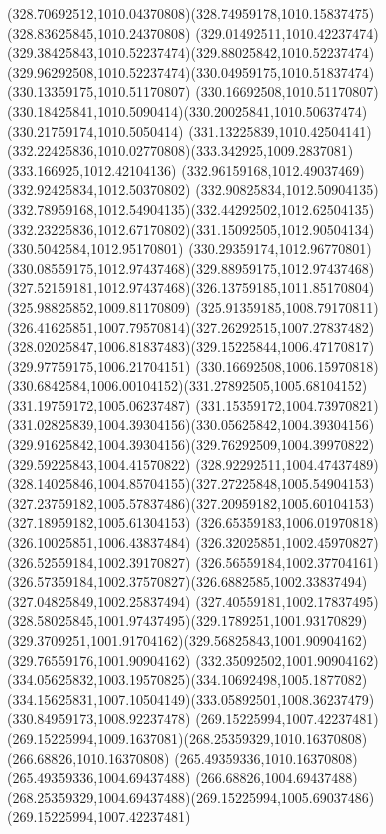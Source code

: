 {{\curveto(328.70692512,1010.04370808)(328.74959178,1010.15837475)(328.83625845,1010.24370808)
\curveto(329.01492511,1010.42237474)(329.38425843,1010.52237474)(329.88025842,1010.52237474)
\curveto(329.96292508,1010.52237474)(330.04959175,1010.51837474)(330.13359175,1010.51170807)
\lineto(330.16692508,1010.51170807)
\curveto(330.18425841,1010.5090414)(330.20025841,1010.50637474)(330.21759174,1010.5050414)
\curveto(331.13225839,1010.42504141)(332.22425836,1010.02770808)(333.342925,1009.2837081)
\lineto(333.166925,1012.42104136)
\lineto(332.96159168,1012.49037469)
\lineto(332.92425834,1012.50370802)
\curveto(332.90825834,1012.50904135)(332.78959168,1012.54904135)(332.44292502,1012.62504135)
\curveto(332.23225836,1012.67170802)(331.15092505,1012.90504134)(330.5042584,1012.95170801)
\curveto(330.29359174,1012.96770801)(330.08559175,1012.97437468)(329.88959175,1012.97437468)
\curveto(327.52159181,1012.97437468)(326.13759185,1011.85170804)(325.98825852,1009.81170809)
\curveto(325.91359185,1008.79170811)(326.41625851,1007.79570814)(327.26292515,1007.27837482)
\curveto(328.02025847,1006.81837483)(329.15225844,1006.47170817)(329.97759175,1006.21704151)
\lineto(330.16692508,1006.15970818)
\curveto(330.6842584,1006.00104152)(331.27892505,1005.68104152)(331.19759172,1005.06237487)
\curveto(331.15359172,1004.73970821)(331.02825839,1004.39304156)(330.05625842,1004.39304156)
\curveto(329.91625842,1004.39304156)(329.76292509,1004.39970822)(329.59225843,1004.41570822)
\curveto(328.92292511,1004.47437489)(328.14025846,1004.85704155)(327.27225848,1005.54904153)
\curveto(327.23759182,1005.57837486)(327.20959182,1005.60104153)(327.18959182,1005.61304153)
\lineto(326.65359183,1006.01970818)
\lineto(326.10025851,1006.43837484)
\lineto(326.32025851,1002.45970827)
\lineto(326.52559184,1002.39170827)
\lineto(326.56559184,1002.37704161)
\curveto(326.57359184,1002.37570827)(326.6882585,1002.33837494)(327.04825849,1002.25837494)
\curveto(327.40559181,1002.17837495)(328.58025845,1001.97437495)(329.1789251,1001.93170829)
\curveto(329.3709251,1001.91704162)(329.56825843,1001.90904162)(329.76559176,1001.90904162)
\curveto(332.35092502,1001.90904162)(334.05625832,1003.19570825)(334.10692498,1005.1877082)
\curveto(334.15625831,1007.10504149)(333.05892501,1008.36237479)(330.84959173,1008.92237478)
\moveto(269.15225994,1007.42237481)
\curveto(269.15225994,1009.1637081)(268.25359329,1010.16370808)(266.68826,1010.16370808)
\lineto(265.49359336,1010.16370808)
\lineto(265.49359336,1004.69437488)
\lineto(266.68826,1004.69437488)
\curveto(268.25359329,1004.69437488)(269.15225994,1005.69037486)(269.15225994,1007.42237481)
}}

